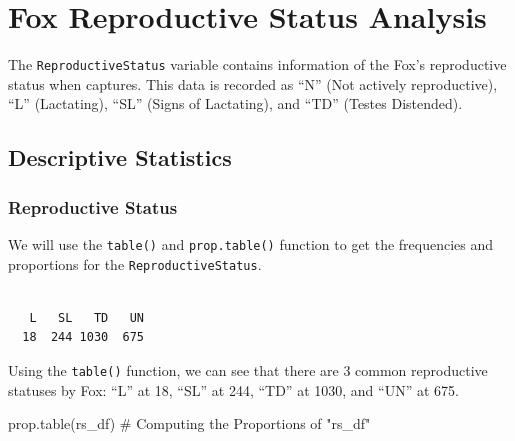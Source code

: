 \documentclass[
  letterpaper,
]{report}
\newenvironment{Shaded}{\begin{snugshade}}{\end{snugshade}}
\newcommand{\CommentTok}[1]{\textcolor[rgb]{0.37,0.37,0.37}{#1}}
\newcommand{\FunctionTok}[1]{\textcolor[rgb]{0.28,0.35,0.67}{#1}}
\newcommand{\NormalTok}[1]{\textcolor[rgb]{0.00,0.23,0.31}{#1}}
\newcommand{\OtherTok}[1]{\textcolor[rgb]{0.00,0.23,0.31}{#1}}
\newcommand{\SpecialCharTok}[1]{\textcolor[rgb]{0.37,0.37,0.37}{#1}}
\begin{document}
\section{Fox Reproductive Status Analysis}\label{fox-rs}

The \texttt{ReproductiveStatus} variable contains information of the
Fox's reproductive status when captures. This data is recorded as ``N''
(Not actively reproductive), ``L'' (Lactating), ``SL'' (Signs of
Lactating), and ``TD'' (Testes Distended).

\subsection{Descriptive Statistics}\label{descriptive-statistics}

\subsubsection{Reproductive Status}\label{reproductive-status}

We will use the \texttt{table()} and \texttt{prop.table()} function to
get the frequencies and proportions for the \texttt{ReproductiveStatus}.

\begin{Shaded}
\end{Shaded}

\begin{verbatim}

   L   SL   TD   UN 
  18  244 1030  675 
\end{verbatim}

Using the \texttt{table()} function, we can see that there are 3 common
reproductive statuses by Fox: ``L'' at 18, ``SL'' at 244, ``TD'' at
1030, and ``UN'' at 675.

\begin{Shaded}
\begin{Highlighting}[]
\FunctionTok{prop.table}\NormalTok{(rs\_df) }\CommentTok{\# Computing the Proportions of "rs\_df"}
\end{Highlighting}
\end{Shaded}
\end{document}
